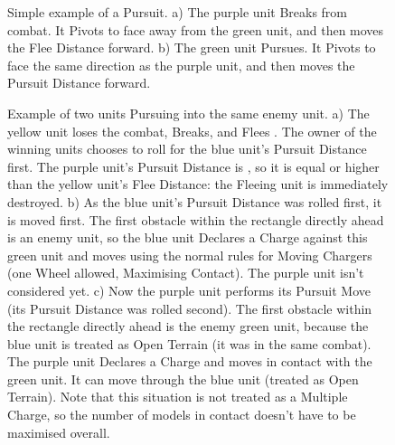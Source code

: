 \begin{figure}[!htbp]
\begin{minipage}{0.52\textwidth}
\def\svgwidth{\textwidth}

\end{minipage}\hfill\begin{minipage}{0.45\textwidth}
\caption{Simple example of a Pursuit.\captionpar
a) The purple unit Breaks from combat. It Pivots to face away from the green unit, and then moves the Flee Distance forward.\captionpar
b) The green unit Pursues. It Pivots to face the same direction as the purple unit, and then moves the Pursuit Distance forward.}
\label{figure/simple_pursuit}
\end{minipage}
\end{figure}

\newcommand{\figTwoPursA}{a)}
\newcommand{\figTwoPursB}{b)}
\newcommand{\figTwoPursC}{c)}
\newcommand{\figTwoPursFirstPursDist}{First Pursuit Distance (blue unit)}
\newcommand{\figTwoPursSecPursDist}{Second Pursuit Distance (purple unit)}
\newcommand{\figTwoPursFleeDist}{\begin{minipage}{0.25\unitlength}\begin{center}Flee Distance (yellow unit)\end{center}\end{minipage}}

\begin{figure}[!htbp]
\begin{minipage}{0.48\textwidth}
\def\svgwidth{\textwidth}

\end{minipage}\hfill\begin{minipage}{0.49\textwidth}
\caption{Example of two units Pursuing into the same enemy unit.\captionpar
a) The yellow unit loses the combat, Breaks, and Flees . The owner of the winning units chooses to roll for the blue unit's Pursuit Distance first. The purple unit's Pursuit Distance is , so it is equal or higher than the yellow unit's Flee Distance: the Fleeing unit is immediately destroyed.\vspace*{1cm}\captionpar
b) As the blue unit's Pursuit Distance was rolled first, it is moved first. The first obstacle within the rectangle directly ahead is an enemy unit, so the blue unit Declares a Charge against this green unit and moves using the normal rules for Moving Chargers (one Wheel allowed, Maximising Contact). The purple unit isn't considered yet.\vspace*{1cm}\captionpar
c) Now the purple unit performs its Pursuit Move (its Pursuit Distance was rolled second). The first obstacle within the rectangle directly ahead is the enemy green unit, because the blue unit is treated as Open Terrain (it was in the same combat). The purple unit Declares a Charge and moves in contact with the green unit. It can move through the blue unit (treated as Open Terrain). Note that this situation is not treated as a Multiple Charge, so the number of models in contact doesn't have to be maximised overall.}
\label{figure/two_units_pursuit}
\end{minipage}
\end{figure}

